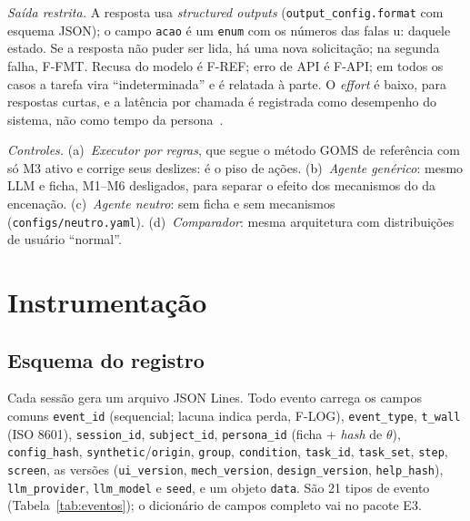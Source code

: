 \documentclass[conference]{IEEEtran}
\begin{document}
\textit{Saída restrita.} A resposta usa \textit{structured outputs} (\texttt{output\_config.format} com esquema JSON); o campo \texttt{acao} é um \texttt{enum} com os números das falas u: daquele estado. Se a resposta não puder ser lida, há uma nova solicitação; na segunda falha, F-FMT. Recusa do modelo é F-REF; erro de API é F-API; em todos os casos a tarefa vira ``indeterminada'' e é relatada à parte. O \textit{effort} é baixo, para respostas curtas, e a latência por chamada é registrada como desempenho do sistema, não como tempo da persona~\cite{laviola2017}.

\textit{Controles.} (a)~\textit{Executor por regras}, que segue o método GOMS de referência com só M3 ativo e corrige seus deslizes: é o piso de ações. (b)~\textit{Agente genérico}: mesmo LLM e ficha, M1--M6 desligados, para separar o efeito dos mecanismos do da encenação. (c)~\textit{Agente neutro}: sem ficha e sem mecanismos (\texttt{configs/neutro.yaml}). (d)~\textit{Comparador}: mesma arquitetura com distribuições de usuário ``normal''.

\section{Instrumentação}
\subsection{Esquema do registro}
Cada sessão gera um arquivo JSON Lines. Todo evento carrega os campos comuns \texttt{event\_id} (sequencial; lacuna indica perda, F-LOG), \texttt{event\_type}, \texttt{t\_wall} (ISO 8601), \texttt{session\_id}, \texttt{subject\_id}, \texttt{persona\_id} (ficha + \textit{hash} de $\theta$), \texttt{config\_hash}, \texttt{synthetic}/\texttt{origin}, \texttt{group}, \texttt{condition}, \texttt{task\_id}, \texttt{task\_set}, \texttt{step}, \texttt{screen}, as versões (\texttt{ui\_version}, \texttt{mech\_version}, \texttt{design\_version}, \texttt{help\_hash}), \texttt{llm\_provider}, \texttt{llm\_model} e \texttt{seed}, e um objeto \texttt{data}. São 21 tipos de evento (Tabela~\ref{tab:eventos}); o dicionário de campos completo vai no pacote E3.
\end{document}
